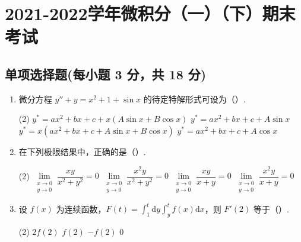 \documentclass[../main.tex]{subfiles}
\begin{document}
\chapter{2021-2022学年微积分（一）（下）期末考试}

\section{单项选择题(每小题 3 分，共 18 分)}
\begin{enumerate}
    \item 微分方程 \( y'' + y = x^2 + 1 + \sin x \) 的待定特解形式可设为（\qquad）.

          \begin{tasks}[label=\textbf{\Alph*.}, label-width=1.5em, column-sep=1em](2)
              \task \( y^* = ax^2 + bx + c + x(A\sin x + B\cos x) \)
              \task \( y^* = ax^2 + bx + c + A\sin x \)
              \task \( y^* = x(ax^2 + bx + c + A\sin x + B\cos x) \)
              \task \( y^* = ax^2 + bx + c + A\cos x \)
          \end{tasks}

    \item 在下列极限结果中，正确的是（\qquad）.

          \begin{tasks}[label=\textbf{\Alph*.}, label-width=1.5em, column-sep=1em](2)
              \task \( \lim\limits_{\substack{x \to 0 \\ y \to 0}} \dfrac{xy}{x^2 + y^2} = 0 \)
              \task \( \lim\limits_{\substack{x \to 0 \\ y \to 0}} \dfrac{x^2 y}{x^2 + y^2} = 0 \)
              \task \( \lim\limits_{\substack{x \to 0 \\ y \to 0}} \dfrac{xy}{x + y} = 0 \)
              \task \( \lim\limits_{\substack{x \to 0 \\ y \to 0}} \dfrac{x^2 y}{x + y} = 0 \)
          \end{tasks}

    \item 设 \( f(x) \) 为连续函数，\( F(t) = \displaystyle \int_1^t \mathrm{d}y \displaystyle \int_y^t f(x) \mathrm{d}x \)，则 \( F'(2) \) 等于（\qquad）.

          \begin{tasks}[label=\textbf{\Alph*.}, label-width=1.5em, column-sep=1em](2)
              \task \( 2f(2) \)
              \task \( f(2) \)
              \task \( -f(2) \)
              \task \( 0 \)
          \end{tasks}


\end{enumerate}
\end{document}
